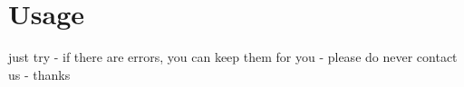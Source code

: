 \section{Usage}
\label{g1:sec:usage}  %

just try - if there are errors, you can keep them for you - please do never contact us - thanks

